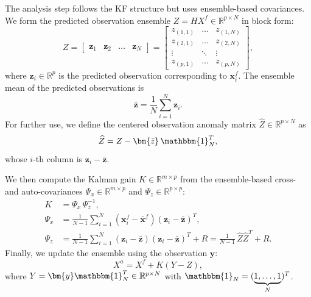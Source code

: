 \documentclass[11p]{elsarticle}
\numberwithin{equation}{section}
\newcommand{\vect}[1]{\ensuremath{\bm{#1}}}
\begin{document}
The analysis step follows the KF structure but uses ensemble-based
covariances. We form the predicted observation ensemble
$Z = H X^f \in \mathbb{R}^{p \times N}$ in block form:
\begin{equation}
Z = \begin{bmatrix}
        \vect{z}_{1} & \vect{z}_{2} & \dots  & \vect{z}_{N}
    \end{bmatrix}
    = \begin{bmatrix}
        z_{(1,1)} & \dots & z_{(1,N)} \\
        z_{(2,1)} & \dots & z_{(2,N)} \\
        \vdots      & \ddots & \vdots     \\
        z_{(p,1)} & \dots & z_{(p,N)}
    \end{bmatrix},
\end{equation}
where $\vect{z}_{i} \in \mathbb{R}^p$ is the predicted observation corresponding to
$\vect{x}_{i}^f$. The ensemble mean of the predicted observations is
\begin{equation}
  \vect{\bar{z}} = \frac{1}{N} \sum_{i=1}^{N} \vect{z}_{i}.
\end{equation}
For further use, we define the centered observation anomaly matrix $\widehat{Z} \in \mathbb{R}^{p \times N}$ as                     
  \begin{equation}                                          
    \widehat{Z} = Z - \vect{\bar{z}}\,\mathbbm{1}_N^T,                                    
    \label{eq:Zhat_def}
  \end{equation}                                                                                                                                                                                                                                                              
  whose $i$-th column is $\vect{z}_i - \vect{\bar{z}}$. 

We then compute the Kalman gain $K \in \mathbb{R}^{m \times p}$ from the
ensemble-based cross- and auto-covariances $\Psi_x \in \mathbb{R}^{m \times p}$ and $\Psi_z \in \mathbb{R}^{p \times p}$:
\begin{align}
    K &= \Psi_{x} \,\Psi_{z}^{-1}, \label{eq:K_EnKF} \\
    \Psi_{x} &=
    \frac{1}{N-1} \sum_{i=1}^{N}
    (\vect{x}_{i}^f - \vect{\bar{x}}^f)
    (\vect{z}_{i} - \vect{\bar{z}})^T, \\   
    \Psi_{z} &=
    \frac{1}{N-1} \sum_{i=1}^{N}
    (\vect{z}_{i} - \vect{\bar{z}})
    (\vect{z}_{i} - \vect{\bar{z}})^T + R
    = \frac{1}{N-1}\,\widehat{Z}\widehat{Z}^T + R.
    \label{eq:Psi_zz}    
\end{align}
Finally, we update the ensemble using the observation $\vect{y}$:
\begin{equation}
    X^a = X^f + K (Y - Z),
\end{equation}
where $Y=\bm{y}\mathbbm{1}_N^T \in \mathbb{R}^{p \times N}$ with \(\mathbbm{1}_N=(\underbrace{1,\ldots,1}_{N})^T\).
\end{document}
